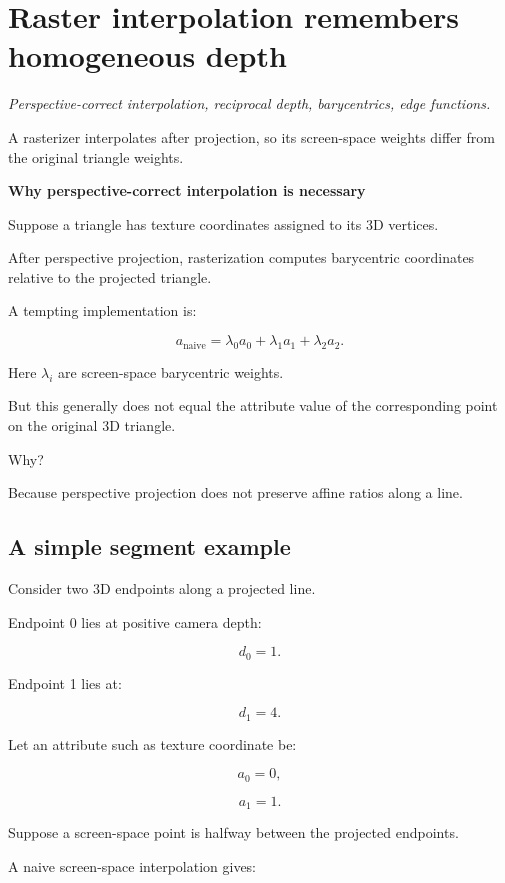 \section{Raster interpolation remembers homogeneous depth}\label{02-foundations-ii-ch034-raster-interpolation-remembers-homogeneous-depth}

\emph{Perspective-correct interpolation, reciprocal depth, barycentrics, edge functions.}

A rasterizer interpolates after projection, so its screen-space weights differ from the original triangle weights.

\textbf{Why perspective-correct interpolation is necessary}

Suppose a triangle has texture coordinates assigned to its 3D vertices.

After perspective projection, rasterization computes barycentric coordinates relative to the projected triangle.

A tempting implementation is:

\[
 \boxed{ a_{\mathrm{naive}}= \lambda_0a_0+\lambda_1a_1+\lambda_2a_2 }.
\]

Here \(\lambda_i\) are screen-space barycentric weights.

But this generally does not equal the attribute value of the corresponding point on the original 3D triangle.

Why?

Because perspective projection does not preserve affine ratios along a line.

\subsection{A simple segment example}\label{02-foundations-ii-ch034-a-simple-segment-example}

Consider two 3D endpoints along a projected line.

Endpoint 0 lies at positive camera depth:

\[
 d_0=1.
\]

Endpoint 1 lies at:

\[
 d_1=4.
\]

Let an attribute such as texture coordinate be:

\[
 a_0=0,
\]

\[
 a_1=1.
\]

Suppose a screen-space point is halfway between the projected endpoints.

A naive screen-space interpolation gives:

